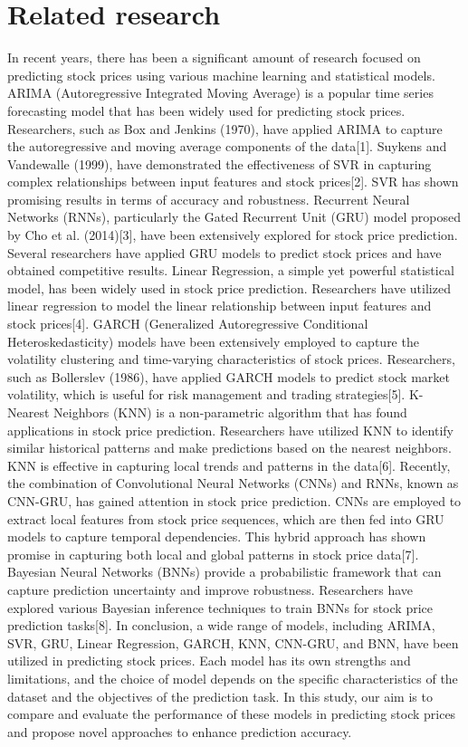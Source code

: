 \documentclass{ieeeojies}
\begin{document}
\section{Related research}
\label{sec:related research}
In recent years, there has been a significant amount of research focused on predicting stock prices using various machine learning and statistical models.
ARIMA (Autoregressive Integrated Moving Average) is a popular time series forecasting model that has been widely used for predicting stock prices. Researchers, such as Box and Jenkins (1970), have applied ARIMA to capture the autoregressive and moving average components of the data[1].
Suykens and Vandewalle (1999), have demonstrated the effectiveness of SVR in capturing complex relationships between input features and stock prices[2]. SVR has shown promising results in terms of accuracy and robustness.
Recurrent Neural Networks (RNNs), particularly the Gated Recurrent Unit (GRU) model proposed by Cho et al. (2014)[3], have been extensively explored for stock price prediction. Several researchers have applied GRU models to predict stock prices and have obtained competitive results.
Linear Regression, a simple yet powerful statistical model, has been widely used in stock price prediction. Researchers have utilized linear regression to model the linear relationship between input features and stock prices[4].
GARCH (Generalized Autoregressive Conditional Heteroskedasticity) models have been extensively employed to capture the volatility clustering and time-varying characteristics of stock prices. Researchers, such as Bollerslev (1986), have applied GARCH models to predict stock market volatility, which is useful for risk management and trading strategies[5].
K-Nearest Neighbors (KNN) is a non-parametric algorithm that has found applications in stock price prediction. Researchers have utilized KNN to identify similar historical patterns and make predictions based on the nearest neighbors. KNN is effective in capturing local trends and patterns in the data[6].
Recently, the combination of Convolutional Neural Networks (CNNs) and RNNs, known as CNN-GRU, has gained attention in stock price prediction. CNNs are employed to extract local features from stock price sequences, which are then fed into GRU models to capture temporal dependencies. This hybrid approach has shown promise in capturing both local and global patterns in stock price data[7].
Bayesian Neural Networks (BNNs) provide a probabilistic framework that can capture prediction uncertainty and improve robustness. Researchers have explored various Bayesian inference techniques to train BNNs for stock price prediction tasks[8].
In conclusion, a wide range of models, including ARIMA, SVR, GRU, Linear Regression, GARCH, KNN, CNN-GRU, and BNN, have been utilized in predicting stock prices. Each model has its own strengths and limitations, and the choice of model depends on the specific characteristics of the dataset and the objectives of the prediction task. In this study, our aim is to compare and evaluate the performance of these models in predicting stock prices and propose novel approaches to enhance prediction accuracy.
\end{document}
